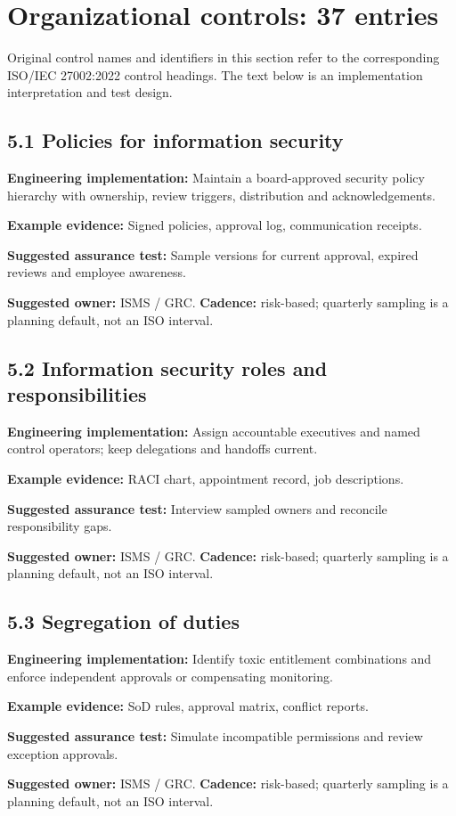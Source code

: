 \documentclass[11pt,letterpaper]{article}
\begin{document}
\section{Organizational controls: 37 entries}
\SourceTag Original control names and identifiers in this section refer to the corresponding ISO/IEC 27002:2022 control headings. The text below is an implementation interpretation and test design.\par
\subsection{5.1 Policies for information security}
\textbf{Engineering implementation:} Maintain a board-approved security policy hierarchy with ownership, review triggers, distribution and acknowledgements.\par
\textbf{Example evidence:} Signed policies, approval log, communication receipts.\par
\textbf{Suggested assurance test:} Sample versions for current approval, expired reviews and employee awareness.\par
\textbf{Suggested owner:} ISMS / GRC. \textbf{Cadence:} risk-based; quarterly sampling is a planning default, not an ISO interval.\par
{}
\subsection{5.2 Information security roles and responsibilities}
\textbf{Engineering implementation:} Assign accountable executives and named control operators; keep delegations and handoffs current.\par
\textbf{Example evidence:} RACI chart, appointment record, job descriptions.\par
\textbf{Suggested assurance test:} Interview sampled owners and reconcile responsibility gaps.\par
\textbf{Suggested owner:} ISMS / GRC. \textbf{Cadence:} risk-based; quarterly sampling is a planning default, not an ISO interval.\par
{}
\subsection{5.3 Segregation of duties}
\textbf{Engineering implementation:} Identify toxic entitlement combinations and enforce independent approvals or compensating monitoring.\par
\textbf{Example evidence:} SoD rules, approval matrix, conflict reports.\par
\textbf{Suggested assurance test:} Simulate incompatible permissions and review exception approvals.\par
\textbf{Suggested owner:} ISMS / GRC. \textbf{Cadence:} risk-based; quarterly sampling is a planning default, not an ISO interval.\par
{}
\end{document}
